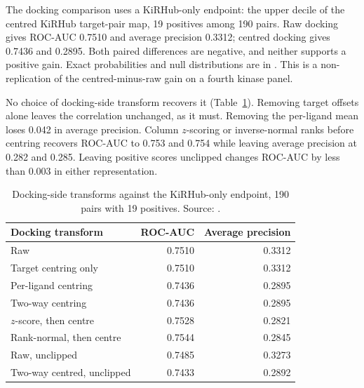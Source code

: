The docking comparison uses a KiRHub-only endpoint: the upper decile of the centred KiRHub
target-pair map, 19 positives among 190 pairs. Raw docking gives ROC-AUC 0.7510 and average
precision 0.3312; centred docking gives 0.7436 and 0.2895. Both paired differences are negative,
and neither supports a positive gain. Exact probabilities and null distributions are in
. This is a non-replication of the
centred-minus-raw gain on a fourth kinase panel.

No choice of docking-side transform recovers it (Table~\ref{tab:s6-kirhub-transform}). Removing
target offsets alone leaves the correlation unchanged, as it must. Removing the per-ligand mean
loses 0.042 in average precision. Column $z$-scoring or inverse-normal ranks before centring
recovers ROC-AUC to 0.753 and 0.754 while leaving average precision at 0.282 and 0.285. Leaving
positive scores unclipped changes ROC-AUC by less than 0.003 in either representation.

\begin{table}[htbp]
\centering
\small
\caption[Docking-side transforms against the KiRHub endpoint]{Docking-side transforms against the KiRHub-only endpoint, 190 pairs with 19 positives.
Source: .}
\label{tab:s6-kirhub-transform}
\begin{tabular}{lrr}
\toprule
Docking transform & ROC-AUC & Average precision \\
\midrule
Raw                                & 0.7510 & 0.3312 \\
Target centring only               & 0.7510 & 0.3312 \\
Per-ligand centring                & 0.7436 & 0.2895 \\
Two-way centring                   & 0.7436 & 0.2895 \\
$z$-score, then centre             & 0.7528 & 0.2821 \\
Rank-normal, then centre           & 0.7544 & 0.2845 \\
Raw, unclipped                     & 0.7485 & 0.3273 \\
Two-way centred, unclipped         & 0.7433 & 0.2892 \\
\bottomrule
\end{tabular}
\end{table}

